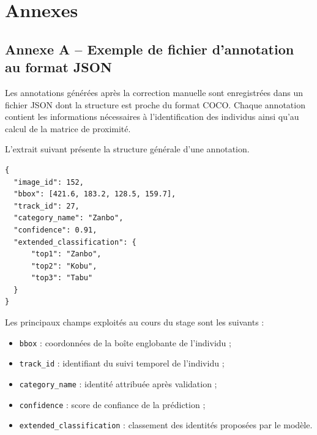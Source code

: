 \documentclass[11pt,a4paper]{report}
\begin{document}

\appendix

\chapter*{Annexes}

\section*{Annexe A -- Exemple de fichier d'annotation au format JSON}

Les annotations générées après la correction manuelle sont enregistrées
dans un fichier JSON dont la structure est proche du format COCO. Chaque
annotation contient les informations nécessaires à l'identification des
individus ainsi qu'au calcul de la matrice de proximité.

L'extrait suivant présente la structure générale d'une annotation.

\begin{verbatim}
{
  "image_id": 152,
  "bbox": [421.6, 183.2, 128.5, 159.7],
  "track_id": 27,
  "category_name": "Zanbo",
  "confidence": 0.91,
  "extended_classification": {
      "top1": "Zanbo",
      "top2": "Kobu",
      "top3": "Tabu"
  }
}
\end{verbatim}

Les principaux champs exploités au cours du stage sont les suivants :

\begin{itemize}
    \item \texttt{bbox} : coordonnées de la boîte englobante de l'individu ;
    \item \texttt{track\_id} : identifiant du suivi temporel de l'individu ;
    \item \texttt{category\_name} : identité attribuée après validation ;
    \item \texttt{confidence} : score de confiance de la prédiction ;
    \item \texttt{extended\_classification} : classement des identités proposées par le modèle.
\end{itemize}
\end{document}
